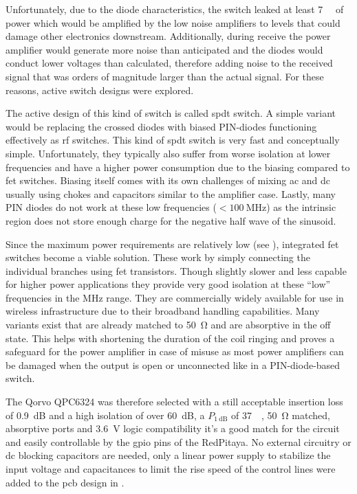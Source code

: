 Unfortunately, due to the diode characteristics, the switch leaked at least \qty{7}{\deci\belm} of power which would be amplified by the low noise amplifiers to levels that could damage other electronics downstream. Additionally, during receive the power amplifier would generate more noise than anticipated and the diodes would conduct lower voltages than calculated, therefore adding noise to the received signal that was orders of magnitude larger than the actual signal. For these reasons, active switch designs were explored.

The active design of this kind of switch is called \acrfull{spdt} switch. A simple variant would be replacing the crossed diodes with biased PIN-diodes functioning effectively as \acrshort{rf} switches. This kind of \acrshort{spdt} switch is very fast and conceptually simple. Unfortunately, they typically also suffer from worse isolation at lower frequencies and have a higher power consumption due to the biasing compared to \acrshort{fet} switches. Biasing itself comes with its own challenges of mixing \acrshort{ac} and \acrshort{dc} usually using chokes and capacitors similar to the amplifier case. Lastly, many PIN diodes do not work at these low frequencies (\(<\qty{100}{\mega\hertz}\)) as the intrinsic region does not store enough charge for the negative half wave of the sinusoid.

Since the maximum power requirements are relatively low (see ), integrated \acrshort{fet} switches become a viable solution. These work by simply connecting the individual branches using \acrshort{fet} transistors. Though slightly slower and less capable for higher power applications they provide very good isolation at these \enquote{low} frequencies in the \unit{\mega\hertz} range. They are commercially widely available for use in wireless infrastructure due to their broadband handling capabilities. Many variants exist that are already matched to \qty{50}{\ohm} and are absorptive in the off state. This helps with shortening the duration of the coil ringing and proves a safeguard for the power amplifier in case of misuse as most power amplifiers can be damaged when the output is open or unconnected like in a PIN-diode-based switch.

The Qorvo QPC6324 was therefore selected with a still acceptable insertion loss of \qty{0.9}{\deci\bel} and a high isolation of over \qty{60}{\deci\bel}, a \(P_{\qty{1}{\deci\bel}}\) of \qty{37}{\deci\belm}, \qty{50}{\ohm} matched, absorptive ports and \qty{3.6}{\volt} logic compatibility it's a good match for the circuit and easily controllable by the \acrfull{gpio} pins of the RedPitaya. No external circuitry or \acrshort{dc} blocking capacitors are needed, only a linear power supply to stabilize the input voltage and capacitances to limit the rise speed of the control lines were added to the \acrshort{pcb} design in .

